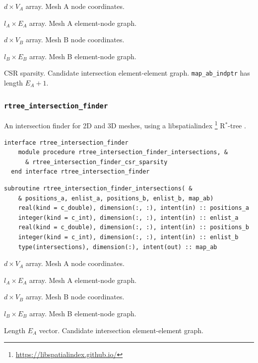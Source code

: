 \documentclass{article}
\begin{document}
\begin{description}[font=\ttfamily\bfseries,leftmargin=2.2\parindent,labelindent=1.7\parindent,noitemsep]
  \item[positions\_a] $d \times V_A$ array. Mesh A node coordinates.
  \item[enlist\_a] $l_A \times E_A$ array. Mesh A element-node graph.
  \item[positions\_b] $d \times V_B$ array. Mesh B node coordinates.
  \item[enlist\_b] $l_B \times E_B$ array. Mesh B element-node graph.
  \item[map\_ab\_indices, map\_ab\_indptr] CSR sparsity. Candidate intersection
    element-element graph. \linebreak \verb+map_ab_indptr+ has length $E_A + 1$.
\end{description}

\subsubsection{\texttt{rtree\_intersection\_finder}}\label{sect:rtree_global}

An intersection finder for 2D and 3D meshes, using a libspatialindex
\footnote{\url{https://libspatialindex.github.io/}} R${}^*$-tree
\citep{guttman1984,beckmann1990}.

\begin{lstlisting}[language=FORTRAN]
  interface rtree_intersection_finder
    module procedure rtree_intersection_finder_intersections, &
      & rtree_intersection_finder_csr_sparsity
  end interface rtree_intersection_finder
\end{lstlisting}

\begin{lstlisting}[language=FORTRAN]
  subroutine rtree_intersection_finder_intersections( &
    & positions_a, enlist_a, positions_b, enlist_b, map_ab)
    real(kind = c_double), dimension(:, :), intent(in) :: positions_a
    integer(kind = c_int), dimension(:, :), intent(in) :: enlist_a
    real(kind = c_double), dimension(:, :), intent(in) :: positions_b
    integer(kind = c_int), dimension(:, :), intent(in) :: enlist_b
    type(intersections), dimension(:), intent(out) :: map_ab
\end{lstlisting}

\begin{description}[font=\ttfamily\bfseries,leftmargin=2.2\parindent,labelindent=1.7\parindent,noitemsep]
  \item[positions\_a] $d \times V_A$ array. Mesh A node coordinates.
  \item[enlist\_a] $l_A \times E_A$ array. Mesh A element-node graph.
  \item[positions\_b] $d \times V_B$ array. Mesh B node coordinates.
  \item[enlist\_b] $l_B \times E_B$ array. Mesh B element-node graph.
  \item[map\_ab] Length $E_A$ vector. Candidate intersection element-element
    graph.
\end{description}
\end{document}

